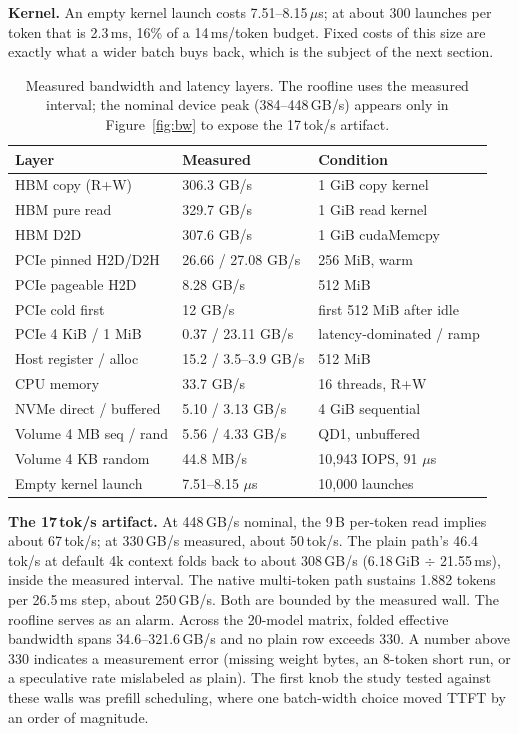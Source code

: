 \documentclass[letterpaper,twocolumn,10pt]{article}
\begin{document}
\textbf{Kernel.} An empty kernel launch costs 7.51--8.15\,$\mu$s; at about 300
launches per token that is 2.3\,ms, 16\% of a 14\,ms/token budget. Fixed costs
of this size are exactly what a wider batch buys back, which is the subject of
the next section.

\begin{table}[t]
\centering
\small
\setlength{\tabcolsep}{3pt}
\begin{tabular}{@{}>{\footnotesize}l>{\footnotesize}l>{\footnotesize}l@{}}
\toprule
Layer & Measured & Condition \\
\midrule
HBM copy (R+W) & 306.3 GB/s & 1 GiB copy kernel \\
HBM pure read & 329.7 GB/s & 1 GiB read kernel \\
HBM D2D & 307.6 GB/s & 1 GiB cudaMemcpy \\
PCIe pinned H2D/D2H & 26.66 / 27.08 GB/s & 256 MiB, warm \\
PCIe pageable H2D & 8.28 GB/s & 512 MiB \\
PCIe cold first & 12 GB/s & first 512 MiB after idle \\
PCIe 4 KiB / 1 MiB & 0.37 / 23.11 GB/s & latency-dominated / ramp \\
Host register / alloc & 15.2 / 3.5--3.9 GB/s & 512 MiB \\
CPU memory & 33.7 GB/s & 16 threads, R+W \\
NVMe direct / buffered & 5.10 / 3.13 GB/s & 4 GiB sequential \\
Volume 4 MB seq / rand & 5.56 / 4.33 GB/s & QD1, unbuffered \\
Volume 4 KB random & 44.8 MB/s & 10{,}943 IOPS, 91 $\mu$s \\
Empty kernel launch & 7.51--8.15 $\mu$s & 10{,}000 launches \\
\bottomrule
\end{tabular}
\caption{Measured bandwidth and latency layers. The roofline uses the
measured interval; the nominal device peak (384--448\,GB/s) appears only in
Figure~\ref{fig:bw} to expose the 17\,tok/s artifact.}
\label{tab:bw}
\end{table}

\textbf{The 17\,tok/s artifact.} At 448\,GB/s nominal, the 9\,B per-token read
implies about 67\,tok/s; at 330\,GB/s measured, about 50\,tok/s. The plain
path's 46.4\,tok/s at default 4k context folds back to about 308\,GB/s
(6.18\,GiB $\div$ 21.55\,ms), inside the measured interval. The native
multi-token path sustains 1.882 tokens per 26.5\,ms step, about 250\,GB/s.
Both are bounded by the measured wall. The roofline serves as an alarm.
Across the 20-model matrix, folded effective bandwidth spans
34.6--321.6\,GB/s and no plain row exceeds 330. A number above 330 indicates a
measurement error (missing weight bytes, an 8-token short run, or a
speculative rate mislabeled as plain). The first knob the study tested against
these walls was prefill scheduling, where one batch-width choice moved TTFT by
an order of magnitude.
\end{document}

